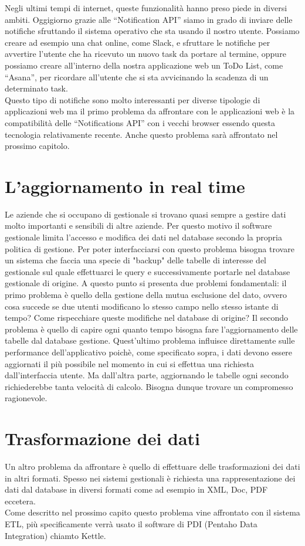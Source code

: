 Negli ultimi tempi di internet, queste funzionalità hanno preso piede in diversi ambiti. Oggigiorno grazie alle “Notification API” siamo in grado di inviare delle notifiche sfruttando il sistema operativo che sta usando il nostro utente. Possiamo creare ad esempio una chat online, come Slack, e sfruttare le notifiche per avvertire l'utente che ha ricevuto un nuovo task da portare al termine, oppure possiamo creare all'interno della nostra applicazione web un ToDo List, come “Asana”, per ricordare all'utente che si sta avvicinando la scadenza di un determinato task.\\
Questo tipo di notifiche sono molto interessanti per diverse tipologie di applicazioni web ma il primo problema da affrontare con le applicazioni web è la compatibilità delle “Notifications API”  con i vecchi  browser essendo questa tecnologia relativamente recente. Anche questo problema sarà affrontato nel prossimo capitolo.


\section{L'aggiornamento in real time}
Le aziende che si occupano di gestionale si trovano quasi sempre a gestire dati molto importanti e sensibili di altre aziende. Per questo motivo il software gestionale limita l'accesso e modifica dei dati nel database secondo la propria politica di gestione. Per poter interfacciarsi con questo problema bisogna trovare un sistema che faccia una specie di "backup" delle tabelle di interesse del gestionale sul quale effettuarci le query e successivamente portarle nel database gestionale di origine. A questo punto si presenta due problemi fondamentali: il primo problema è quello della gestione della mutua esclusione del dato, ovvero cosa succede se due utenti modificano lo stesso campo nello stesso istante di tempo? Come rispecchiare queste modifiche nel database di origine? Il secondo problema è quello di capire ogni quanto tempo bisogna fare l'aggiornamento delle tabelle dal database gestione. Quest'ultimo problema influisce direttamente sulle performance dell'applicativo poichè, come specificato sopra, i dati devono essere aggiornati il più possibile nel momento in cui si effettua una richiesta dall'interfaccia utente. Ma dall'altra parte, aggiornando le tabelle ogni secondo richiederebbe tanta velocità di calcolo. Bisogna dunque trovare un compromesso ragionevole. 

\section{Trasformazione dei dati}
Un altro problema da affrontare è quello di effettuare delle trasformazioni dei dati in altri formati. Spesso nei sistemi gestionali è richiesta una rappresentazione dei dati dal database in diversi formati come ad esempio in XML, Doc, PDF eccetera.  \\
Come descritto nel prossimo capito questo problema vine affrontato con il sistema ETL, più specificamente verrà usato il software di PDI (Pentaho Data Integration) chiamto Kettle.






